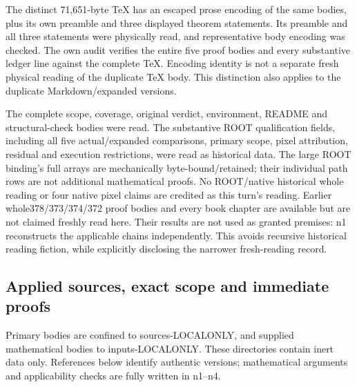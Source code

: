 \documentclass[11pt]{article}
\begin{document}
The distinct 71,651-byte TeX has an escaped prose encoding of the same bodies, plus its own preamble and three displayed theorem statements. Its preamble and all three statements were physically read, and representative body encoding was checked. The own audit verifies the entire five proof bodies and every substantive ledger line against the complete TeX. Encoding identity is not a separate fresh physical reading of the duplicate TeX body. This distinction also applies to the duplicate Markdown/expanded versions.

The complete scope, coverage, original verdict, environment, README and structural-check bodies were read. The substantive ROOT qualification fields, including all five actual/expanded comparisons, primary scope, pixel attribution, residual and execution restrictions, were read as historical data. The large ROOT binding's full arrays are mechanically byte-bound/retained; their individual path rows are not additional mathematical proofs. No ROOT/native historical whole reading or four native pixel claims are credited as this turn's reading. Earlier whole378/373/374/372 proof bodies and every book chapter are available but are not claimed freshly read here. Their results are not used as granted premises: n1 reconstructs the applicable chains independently. This avoids recursive historical reading fiction, while explicitly disclosing the narrower fresh-reading record.

\subsection*{Applied sources, exact scope and immediate proofs}

Primary bodies are confined to sources-LOCALONLY, and supplied mathematical bodies to inputs-LOCALONLY. These directories contain inert data only. References below identify authentic versions; mathematical arguments and applicability checks are fully written in n1--n4.
\end{document}
